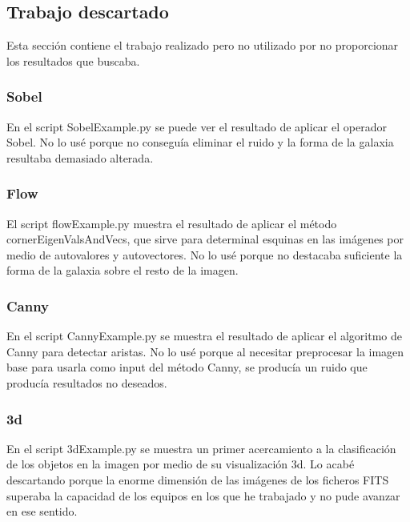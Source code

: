 \documentclass[a4paper,12pt]{article}
\begin{document}
\subsection{Trabajo descartado}
Esta sección contiene el trabajo realizado pero no utilizado por no proporcionar los resultados que buscaba. %
\subsubsection{Sobel}
En el script SobelExample.py se puede ver el resultado de aplicar el operador Sobel. No lo usé porque no conseguía eliminar el ruido y la forma de la galaxia resultaba demasiado alterada.
\subsubsection{Flow}
El script flowExample.py muestra el resultado de aplicar el método cornerEigenValsAndVecs, que sirve para determinal esquinas en las imágenes por medio de autovalores y autovectores. No lo usé porque no destacaba suficiente la forma de la galaxia sobre el resto de la imagen.
\subsubsection{Canny}
En el script CannyExample.py se muestra el resultado de aplicar el algoritmo de Canny para detectar aristas. No lo usé porque al necesitar preprocesar la imagen base para usarla como input del método Canny, se producía un ruido que producía resultados no deseados.
\subsubsection{3d}
En el script 3dExample.py se muestra un primer acercamiento a la clasificación de los objetos en la imagen por medio de su visualización 3d. Lo acabé descartando porque la enorme dimensión de las imágenes de los ficheros FITS superaba la capacidad de los equipos en los que he trabajado y no pude avanzar en ese sentido.

\renewcommand\refname{Bibliografía y referencias}


\nocite{*}
\end{document}
